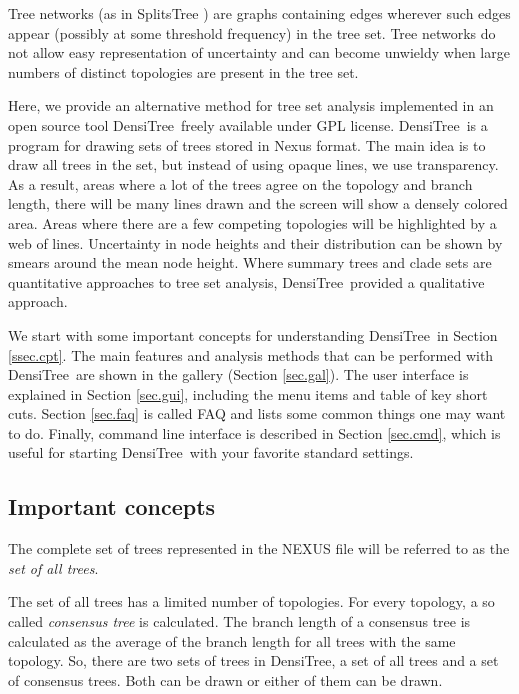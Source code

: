 \documentclass{article}
\def\DensiTree{DensiTree}
\begin{document}
Tree networks (as in SplitsTree \cite{SplitsTree}) are graphs containing
edges wherever such edges appear (possibly at some threshold frequency)
in the tree set. Tree networks do not allow easy representation of
uncertainty %
and can become unwieldy when large numbers of
distinct topologies are present in the tree set.

Here, we provide an alternative method for tree set analysis implemented
in an open source tool \DensiTree\ freely available under GPL license.
\DensiTree\ is a program for drawing sets of trees stored in Nexus format.
The main idea is to draw all trees in the set, but instead of using opaque
lines, we use transparency. As a result, areas where a lot of the trees agree
on the topology and branch length, there will be many lines drawn and the
screen will show a densely colored area. Areas where there are a few competing
topologies will be highlighted by a web of lines.
Uncertainty in node heights and their distribution can be shown by smears
around the mean node height.
Where summary trees and clade sets are quantitative approaches to tree set analysis,
\DensiTree\ provided a qualitative approach.

We start with some important concepts for understanding \DensiTree\ in Section \ref{ssec.cpt}.
The main features and analysis methods that can be performed with \DensiTree\ are
shown in the gallery (Section \ref{sec.gal}). The user 
interface is explained in Section \ref{sec.gui}, including the menu items
and table of key short cuts. 
Section \ref{sec.faq} is called FAQ and lists some common things one may want to do.
Finally, command line interface is described in 
Section \ref{sec.cmd}, which is useful for starting \DensiTree\ with your
favorite standard settings.

\subsection{Important concepts \label{ssec.cpt}}

The complete set of trees represented in the NEXUS file will be referred to
as the {\em set of all trees}.

The set of all trees has a limited number of topologies. For every topology,
a so called {\em consensus tree} is calculated. The branch length of a consensus
tree is calculated as the average of the branch length for all trees with the
same topology. So, there are two sets of trees in \DensiTree, a set of all trees
and a set of consensus trees. Both can be drawn or either of them can be drawn.
\end{document}
